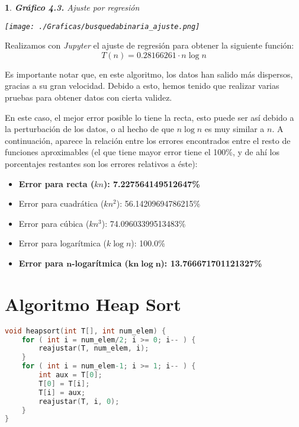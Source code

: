 \documentclass[10pt, a4paper]{article}
\theoremstyle{theorem-style}
\newtheorem*{datos}{}
\theoremstyle{theorem-style}
\theoremstyle{definition-style}
\theoremstyle{remark-style}
\theoremstyle{example-style}
\theoremstyle{definition-style}
\theoremstyle{remark-style}
\begin{document}
\begin{datos}
	{\bf\sffamily Gráfico 4.3.} {\sffamily Ajuste por regresión}\\
	\vspace{-0.7cm}
	\begin{center}
		\texttt{[image: ./Graficas/busquedabinaria\_ajuste.png]}
	\end{center}	
\end{datos}

Realizamos con \emph{Jupyter} el ajuste de regresión para obtener la siguiente función:
$$T(n)=0.28166261 \cdot n\log n$$

Es importante notar que, en este algoritmo, los datos han salido más dispersos, gracias a su gran velocidad. Debido a esto, hemos tenido que realizar varias pruebas para obtener datos con cierta validez.

En este caso, el mejor error posible lo tiene la recta, esto puede ser así debido a la perturbación de los datos, o al hecho de que $n\log n$ es muy similar a $n$. A continuación, aparece la relación entre los errores encontrados entre el resto de funciones aproximables (el que tiene mayor error tiene el 100\%, y de ahí los porcentajes restantes son los errores relativos a éste):

\begin{itemize}
	\item \textbf{Error para recta ($kn$): 7.227564149512647\%}
	\item Error para cuadrática ($kn^2$): 56.14209694786215\%
	\item Error para cúbica ($kn^3$): 74.09603399513483\%
	\item Error para logarítmica ($k\log n$): 100.0\%
	\item \textbf{Error para $\boldsymbol{n}$-logarítmica ($\boldsymbol{kn\log n}$): 13.766671701121327\%}
\end{itemize}

\section{Algoritmo Heap Sort}

\begin{lstlisting}[language=C]
void heapsort(int T[], int num_elem) {
	for ( int i = num_elem/2; i >= 0; i-- ) {
		reajustar(T, num_elem, i);
	}
	for ( int i = num_elem-1; i >= 1; i-- ) {
		int aux = T[0];
		T[0] = T[i];
		T[i] = aux;
		reajustar(T, i, 0);
	}
}
\end{lstlisting}
\end{document}
